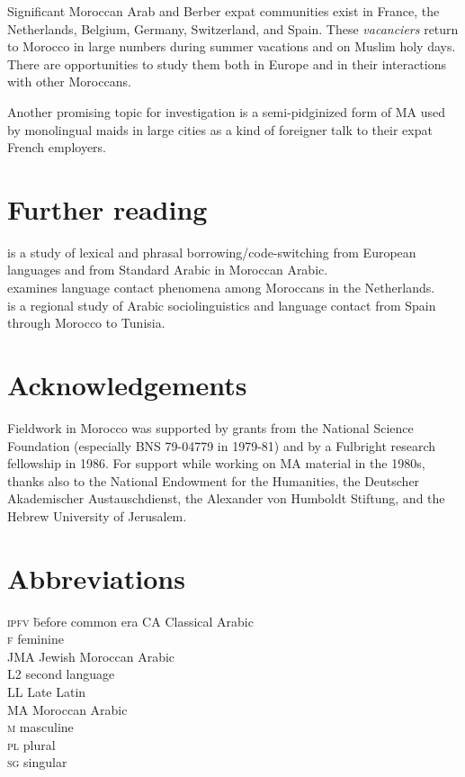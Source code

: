 \documentclass[output=paper]{langsci/langscibook}
\begin{document}
Significant Moroccan Arab and Berber expat communities exist in France, the Netherlands, Belgium, Germany, Switzerland, and Spain. These \textit{vacanciers} return to Morocco in large numbers during summer vacations and on Muslim holy days. There are opportunities to study them both in Europe \citep{Nortier1990} and in their interactions with other Moroccans. 

Another promising topic for investigation is a semi-pidginized form of MA used by monolingual maids in large cities as a kind of foreigner talk to their expat French employers.

\section*{Further reading}

\citet{Heath1989} is a study of lexical and phrasal borrowing/code-switching from European languages and from Standard Arabic in Moroccan Arabic.\\
\citet{Nortier1990} examines language contact phenomena among Moroccans in the Netherlands.\\
\citet{Sayahi2014} is a regional study of Arabic sociolinguistics and language contact from Spain through Morocco to Tunisia.

\section*{Acknowledgements}

Fieldwork in Morocco was supported by grants from the National Science Foundation (especially BNS 79-04779 in 1979-81) and by a Fulbright research fellowship in 1986. For support while working on MA material in the 1980s, thanks also to the National Endowment for the Humanities, the Deutscher Akademischer Austauschdienst, the Alexander von Humboldt Stiftung, and the Hebrew University of Jerusalem.

\newpage

\section*{Abbreviations}
\begin{multicols}{2}
\begin{tabbing}
\textsc{ipfv} \hspace{1em} \= before common era\kill
CA          \> Classical Arabic\\
\textsc{f}  \> feminine\\
JMA         \> Jewish Moroccan Arabic\\
L2          \> second language \\
LL          \> Late Latin\\
MA          \> Moroccan Arabic\\
\textsc{m}  \> masculine\\
\textsc{pl} \> plural\\
\textsc{sg} \> singular
\end{tabbing}
\end{multicols}


{\sloppy\printbibliography[heading=subbibliography,notkeyword=this]}
\end{document}
